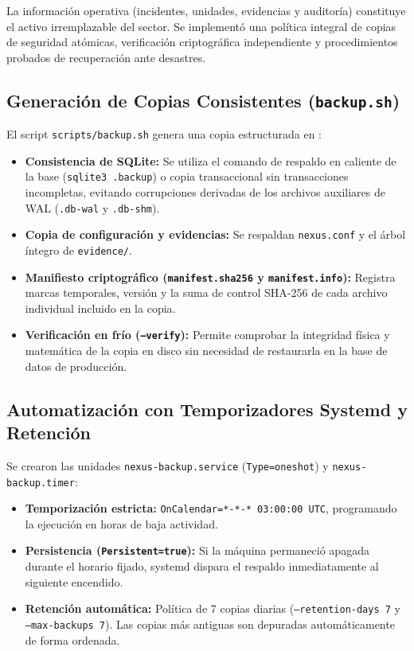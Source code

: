 \documentclass[10pt,a4paper]{article}
\begin{document}
La información operativa (incidentes, unidades, evidencias y auditoría) constituye el activo irremplazable del sector. Se implementó una política integral de copias de seguridad atómicas, verificación criptográfica independiente y procedimientos probados de recuperación ante desastres.

\subsection{Generación de Copias Consistentes (\texttt{backup.sh})}

El script \texttt{scripts/backup.sh} genera una copia estructurada en :
\begin{itemize}[leftmargin=*]
    \item \textbf{Consistencia de SQLite:} Se utiliza el comando de respaldo en caliente de la base (\texttt{sqlite3 .backup}) o copia transaccional sin transacciones incompletas, evitando corrupciones derivadas de los archivos auxiliares de WAL (\texttt{.db-wal} y \texttt{.db-shm}).
    \item \textbf{Copia de configuración y evidencias:} Se respaldan \texttt{nexus.conf} y el árbol íntegro de \texttt{evidence/}.
    \item \textbf{Manifiesto criptográfico (\texttt{manifest.sha256} y \texttt{manifest.info}):} Registra marcas temporales, versión y la suma de control SHA-256 de cada archivo individual incluido en la copia.
    \item \textbf{Verificación en frío (\texttt{--verify}):} Permite comprobar la integridad física y matemática de la copia en disco sin necesidad de restaurarla en la base de datos de producción.
\end{itemize}

\subsection{Automatización con Temporizadores Systemd y Retención}

Se crearon las unidades \texttt{nexus-backup.service} (\texttt{Type=oneshot}) y \nolinkurl{nexus-backup.timer}:
\begin{itemize}[leftmargin=*]
    \item \textbf{Temporización estricta:} \texttt{OnCalendar=*-*-* 03:00:00 UTC}, programando la ejecución en horas de baja actividad.
    \item \textbf{Persistencia (\texttt{Persistent=true}):} Si la máquina permaneció apagada durante el horario fijado, systemd dispara el respaldo inmediatamente al siguiente encendido.
    \item \textbf{Retención automática:} Política de 7 copias diarias (\texttt{--retention-days 7} y \texttt{--max-backups 7}). Las copias más antiguas son depuradas automáticamente de forma ordenada.
\end{itemize}
\end{document}
